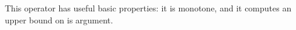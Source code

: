 This operator has useful basic properties: it is monotone, and it computes
an upper bound on is argument.

\begin{code}%
%
\>[4]\AgdaSpace{}%
\AgdaSymbol{:}\AgdaSpace{}%
\AgdaSpace{}%
\AgdaSpace{}%
\AgdaSpace{}%
\AgdaSpace{}%
\AgdaSpace{}%
\AgdaSpace{}%
\<%
\\
%
\\[\AgdaEmptyExtraSkip]%
%
\>[4]\AgdaSpace{}%
\AgdaSymbol{:}\AgdaSpace{}%
\AgdaSpace{}%
\AgdaSymbol{\{}\AgdaSpace{}%
\AgdaSymbol{\}}\<%
\\
\>[4][@{}l@{\AgdaIndent{0}}]%
\>[6]\AgdaSpace{}%
\AgdaSpace{}%
\AgdaSpace{}%
\<%
\\
%
\>[6]\AgdaSpace{}%
\AgdaSymbol{(}\AgdaSpace{}%
\AgdaSymbol{)}\AgdaSpace{}%
\AgdaSpace{}%
\AgdaSymbol{(}\AgdaSpace{}%
\AgdaSymbol{)}\<%
\end{code}


